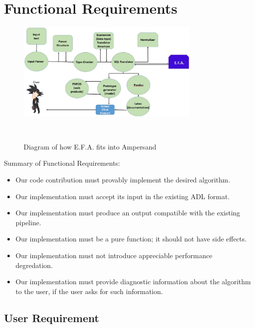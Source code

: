 \documentclass[12pt]{report}
\begin{document}
\section{Functional Requirements}\label{sec:Functional}
\begin{figure}[!htb]
	\centering
	\includegraphics[width=0.8\textwidth]{../figures/functional}
	\caption{Diagram of how E.F.A. fits into Ampersand}~\label{fig:figure2}
\end{figure}
Summary of Functional Requirements:
\begin{itemize}
\item Our code contribution must provably implement the desired algorithm.

\item Our implementation must accept its input in the existing ADL format.

\item Our implementation must produce an output compatible with the existing pipeline. 

\item Our implementation must be a pure function; it should not have side effects.  

\item Our implementation must not introduce appreciable performance degredation. 

\item Our implementation must provide diagnostic information about the algorithm to
the user, if the user asks for such information.
\end{itemize}

\subsection{User Requirement}
\end{document}
